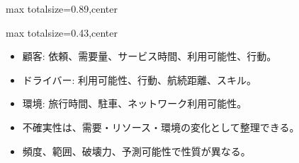 \begin{minipage}[t]{0.58\textwidth}
\begin{adjustbox}{max totalsize={\textwidth}{0.89\textheight},center}
\begin{minipage}{\textwidth}
\end{minipage}
\end{adjustbox}
\end{minipage}


\clearpage
{}
\begin{minipage}[t]{0.405\textwidth}
\begin{adjustbox}{max totalsize={\textwidth}{0.43\textheight},center}
\begin{minipage}{\textwidth}\scriptsize
{}\begin{itemize}
\item 顧客: 依頼、需要量、サービス時間、利用可能性、行動。
\item ドライバー: 利用可能性、行動、航続距離、スキル。
\item 環境: 旅行時間、駐車、ネットワーク利用可能性。
\end{itemize}\begin{itemize}
\item 不確実性は、需要・リソース・環境の変化として整理できる。
\item 頻度、範囲、破壊力、予測可能性で性質が異なる。
\end{itemize}
\end{minipage}
\end{adjustbox}
\end{minipage}\hfill
